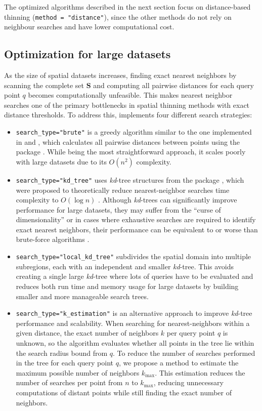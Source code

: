 The optimized algorithms described in the next section focus on distance-based thinning (\texttt{method\ =\ "distance"}), since the other methods do not rely on neighbour searches and have lower computational cost.

\subsection{Optimization for large datasets}\label{optimization-for-large-datasets}

As the size of spatial datasets increases, finding exact nearest neighbors by scanning the complete set \(\mathbf{S}\) and computing all pairwise distances for each query point \(q\) becomes computationally unfeasible. This makes nearest neighbor searches one of the primary bottlenecks in spatial thinning methods with exact distance thresholds. To address this,  implements four different search strategies:

\begin{itemize}
\tightlist
\item
  \texttt{search\_type="brute"} is a greedy algorithm similar to the one implemented in  and , which calculates all pairwise distances between points using the  package \citep{fieldsRpackage}. While being the most straightforward approach, it scales poorly with large datasets due to its \(O(n^2)\) complexity.
\item
  \texttt{search\_type="kd\_tree"} uses \emph{kd}-tree structures from the  package \citep{elsebergcomparison}, which were proposed to theoretically reduce nearest-neighbor searches time complexity to \(O(\log n)\) \citep{friedman1975algorithm}. Although \emph{kd}-trees can significantly improve performance for large datasets, they may suffer from the ``curse of dimensionality'' or in cases where exhaustive searches are required to identify exact nearest neighbors, their performance can be equivalent to or worse than brute-force algorithms \citep{ram2019revisiting}.
\item
  \texttt{search\_type="local\_kd\_tree"} subdivides the spatial domain into multiple subregions, each with an independent and smaller \emph{kd}-tree. This avoids creating a single large \emph{kd}-tree where lots of queries have to be evaluated and reduces both run time and memory usage for large datasets by building smaller and more manageable search trees.
\item
  \texttt{search\_type="k\_estimation"} is an alternative approach to improve \emph{kd}-tree performance and scalability. When searching for nearest-neighbors within a given distance, the exact number of neighbors \(k\) per query point \(q\) is unknown, so the algorithm evaluates whether all points in the tree lie within the search radius bound from \(q\). To reduce the number of searches performed in the tree for each query point \(q\), we propose a method to estimate the maximum possible number of neighbors \(k_\text{max}\). This estimation reduces the number of searches per point from \(n\) to \(k_\text{max}\), reducing unnecessary computations of distant points while still finding the exact number of neighbors.
\end{itemize}

